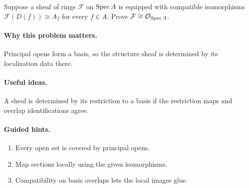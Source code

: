 \begin{problem}\label{prob:vi17-p18}
Suppose a sheaf of rings $\mathcal F$ on $\operatorname{Spec} A$ is equipped with compatible isomorphisms $\mathcal F(D(f))\cong A_f$ for every $f\in A$.  Prove $\mathcal F\cong\mathcal O_{\operatorname{Spec} A}$.
\end{problem}

\ifdefined\FullProblemDossiers
\paragraph{Why this problem matters.}
Principal opens form a basis, so the structure sheaf is determined by its localization data there.

\paragraph{Useful ideas.}
A sheaf is determined by its restriction to a basis if the restriction maps and overlap identifications agree.

\paragraph{Guided hints.}
\begin{enumerate}
\item Every open set is covered by principal opens.
\item Map sections locally using the given isomorphisms.
\item Compatibility on basis overlaps lets the local images glue.
\end{enumerate}

